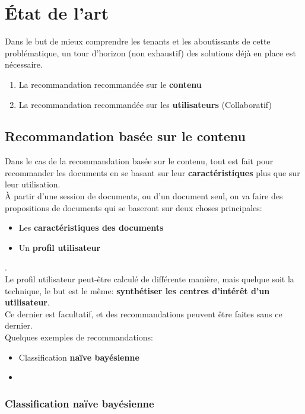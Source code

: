 \chapter{État de l'art}
    Dans le but de mieux comprendre les tenants et les aboutissants de cette problématique, un tour d'horizon (non exhaustif) des solutions déjà en place est nécessaire.
    \begin{enumerate}
        \item La recommandation recommandée sur le \textbf{contenu}
        \item La recommandation recommandée sur les \textbf{utilisateurs} (Collaboratif)
    \end{enumerate}

    \section{Recommandation basée sur le contenu}
        Dans le cas de la recommandation basée sur le contenu, tout est fait pour recommander les documents en se basant sur leur \textbf{caractéristiques} plus que sur leur utilisation.\\
        À partir d'une session de documents, ou d'un document seul, on va faire des propositions de documents qui se baseront sur deux choses principales:
        \begin{itemize}
            \item Les \textbf{caractéristiques des documents}
            \item Un \textbf{profil utilisateur}
        \end{itemize}.\\
        
        Le profil utilisateur peut-être calculé de différente manière, mais quelque soit la technique, le but est le même: \textbf{synthétiser les centres d'intérêt d'un utilisateur}.\\
        Ce dernier est facultatif, et des recommandations peuvent être faites sans ce dernier.\\

        Quelques exemples de recommandations:
        \begin{itemize}
            \item Classification \textbf{naïve bayésienne}
            \item %
        \end{itemize}

        \subsection{Classification naïve bayésienne}
